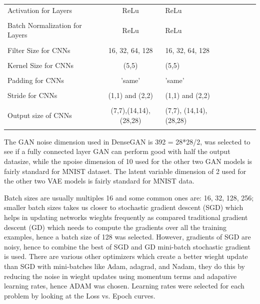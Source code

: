 \documentclass{article}
\begin{document}
\begin{table}[t]
\begin{tabular}{lclclcl}
		    Activation for Layers    		& ReLu      	& ReLu   \\
											&      	        &   \\
		    Batch Normalization for Layers  & ReLu 			& ReLu   \\
											&      	        &   \\
											
			\midrule

		    Filter Size for CNNs    		& 16, 32, 64, 128     	& 16, 32, 64, 128  \\
											&      	        		&   \\
											
		    Kernel Size for CNNs    		& (5,5)     	& (5,5)  \\
											&      	        &   \\
		    Padding for CNNs    			& 'same'     	& 'same'   \\
											&      	        &   \\
		    Stride for CNNs    				&(1,1) and (2,2)&(1,1) and (2,2)   \\
											&      	        &   \\
	
		    Output size of CNNs    			&(7,7),(14,14),(28,28)& (7,7), (14,14), (28,28)   \\
											&      	        &   \\
		
			\bottomrule
		\end{tabular}
	\end{table}

	The GAN noise dimension used in DenseGAN is 392 = 28*28/2, was selected to see if a fully connected layer GAN can perform good with half the output datasize, while the npoise dimension of 10 used for the other two GAN models is fairly standard for MNIST dataset. The latent variable dimension of 2 used for the other two VAE models is fairly standard for MNIST data. 

	Batch sizes are usually multiples 16 and some common ones are: 16, 32, 128, 256; smaller batch sizes takes us closer to stochastic gradient descent (SGD) which helps in updating networks wieghts frequently as compared traditional gradient descent (GD) which needs to compute the gradients over all the training examples, hence a batch size of 128 was selected. However, gradients of SGD are noisy, hence to combine the best of SGD and GD mini-batch stochastic gradient is used. There are various other optimizers which create a better wieght update than SGD with mini-batches like Adam, adagrad, and Nadam, they do this by reducing the noise in wieght updates using momentum terms and adapative learning rates, hence ADAM was chosen. Learning rates were selected for each problem by looking at the Loss vs. Epoch curves. 
	
\end{document}
